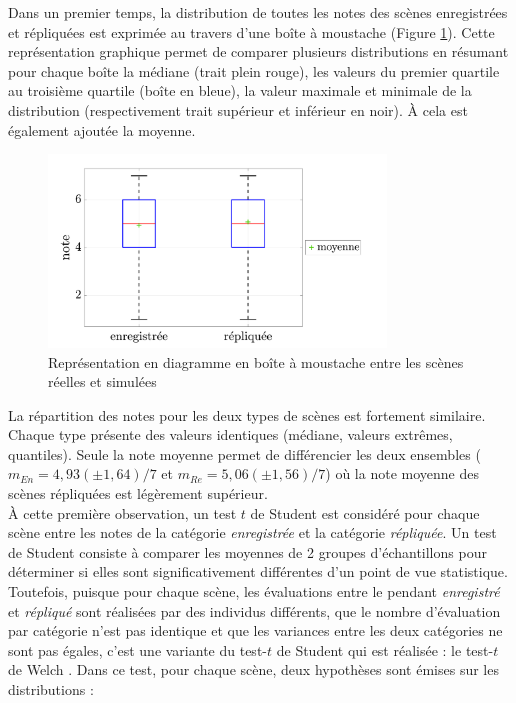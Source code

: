 Dans un premier temps, la distribution de toutes les notes des scènes enregistrées et répliquées est exprimée au travers d'une boîte à moustache (Figure \ref{fig:ANOVA_scene}). Cette représentation graphique permet de comparer plusieurs distributions en résumant pour chaque boîte la médiane (trait plein rouge), les valeurs du  premier quartile au troisième quartile (boîte en bleue), la valeur maximale et minimale de la distribution (respectivement trait supérieur et inférieur en noir). \`A cela est également ajoutée la moyenne.\\

\begin{figure}[h]
\centering
\includegraphics[width = 0.8\textwidth]{./figures/test_perceptif/testPerceptif_boxplotType.pdf}
\caption{Représentation en diagramme en boîte à moustache entre les scènes réelles et simulées}\label{fig:ANOVA_scene}
\end{figure}

La répartition des notes pour les deux types de scènes est fortement similaire. Chaque type présente des valeurs identiques (médiane, valeurs extrêmes, quantiles). Seule la note moyenne permet de différencier les deux ensembles ($m_{En} = 4,93 (\pm 1,64) / 7$ et $m_{Re} = 5,06 (\pm 1,56) / 7$) où la note moyenne des scènes répliquées est légèrement supérieur.\\

À cette première observation, un test $t$ de Student est considéré pour chaque scène entre les notes de la catégorie \textit{enregistrée} et la catégorie \textit{répliquée}. Un test de Student consiste à comparer les moyennes de 2 groupes d'échantillons pour déterminer si elles sont significativement différentes d'un point de vue statistique. Toutefois, puisque pour chaque scène, les évaluations entre le pendant \textit{enregistré} et \textit{répliqué} sont réalisées par des individus différents, que le nombre d'évaluation par catégorie n'est pas identique et que les variances entre les deux catégories ne sont pas égales, c'est une variante du test-$t$ de Student qui est réalisée : le test-$t$ de Welch \cite{ruxton2006unequal}. Dans ce test, pour chaque scène, deux hypothèses sont émises sur les distributions :

